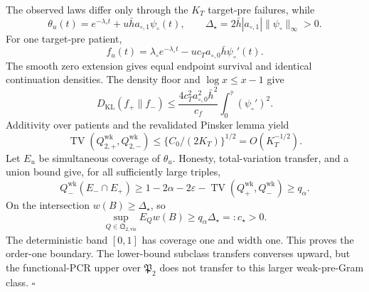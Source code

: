 The observed laws differ only through the \(K_T\) target-pre failures, while
\[
 \theta_u(t)=e^{-\lambda_\circ t}+u\bar h a_{\circ,1}\psi_\circ(t),
 \qquad
 \Delta_\star=2\bar h|a_{\circ,1}|\|\psi_\circ\|_\infty>0. \tag{6}
\]
For one target-pre patient,
\[
 f_u(t)=\lambda_\circ e^{-\lambda_\circ t}
 -u c_Ta_{\circ,0}\bar h\psi_\circ'(t).                \tag{7}
\]
The smooth zero extension gives equal endpoint survival and identical continuation densities. The density floor and \(\log x\le x-1\) give
\[
 D_{\mathrm{KL}}(f_+\|f_-)
 \le\frac{4c_T^2a_{\circ,0}^2\bar h^2}{c_f}
 \int_0^{\bar\tau}(\psi_\circ')^2.                     \tag{8}
\]
Additivity over patients and the revalidated Pinsker lemma yield
\[
 \operatorname{TV}(Q_{2,+}^{\mathrm{wk}},Q_{2,-}^{\mathrm{wk}})
 \le\{C_0/(2K_T)\}^{1/2}=O(K_T^{-1/2}).                 \tag{9}
\]
Let \(E_u\) be simultaneous coverage of \(\theta_u\). Honesty, total-variation transfer, and a union bound give, for all sufficiently large triples,
\[
 Q_-^{\mathrm{wk}}(E_-\cap E_+)
 \ge1-2\alpha-2\varepsilon-
 \operatorname{TV}(Q_+^{\mathrm{wk}},Q_-^{\mathrm{wk}})
 \ge q_\alpha.                                          \tag{10}
\]
On the intersection \(w(B)\ge\Delta_\star\), so
\[
 \sup_{Q\in\mathfrak Q_{2,\mathrm{vis}}}E_Qw(B)
 \ge q_\alpha\Delta_\star=:c_\star>0.                 \tag{11}
\]
The deterministic band \([0,1]\) has coverage one and width one. This proves the order-one boundary. The lower-bound subclass transfers converses upward, but the functional-PCR upper over \(\mathfrak P_2\) does not transfer to this larger weak-pre-Gram class. \(\square\)